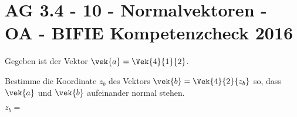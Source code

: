 \section{AG 3.4 - 10 - Normalvektoren - OA - BIFIE Kompetenzcheck 2016}

\begin{beispiel}[AG 3.4]{1} %
				Gegeben ist der Vektor $\vek{a}=\Vek{4}{1}{2}$.

Bestimme die Koordinate $z_{b}$ des Vektors $\vek{b}=\Vek{4}{2}{z_{b}}$ so, dass $\vek{a}$ und $\vek{b}$ aufeinander normal stehen.\leer

$z_{b}=$ 
\end{beispiel}	